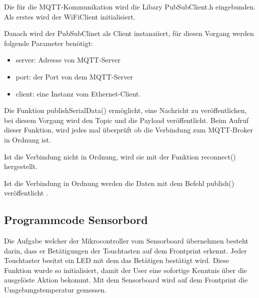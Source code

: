 Die für die MQTT-Kommunikation wird die Libary PubSubClient.h eingebunden. Als erstes wird der WiFiClient initialisiert. 

Danach wird der PubSubClinet als Client instanziiert, für diesen Vorgang werden folgende Parameter benötigt:\\
\begin{itemize}
\item 	server: Adresse von MQTT-Server\\
\item 	port: der Port von dem MQTT-Server\\
\item 	client: eine Instanz vom Ethernet-Client.\\
\end{itemize}
Die Funktion publishSerialData() ermöglicht, eine Nachricht zu veröffentlichen, bei diesem Vorgang wird den Topic und die Payload veröffentlicht. Beim Aufruf dieser Funktion, wird jedes mal überprüft ob die Verbindung zum MQTT-Broker in Ordnung ist. 

Ist die Verbindung nicht in Ordnung, wird sie mit der Funktion reconnect() hergestellt.

Ist die Verbindung in Ordnung werden die Daten mit dem Befehl publish() veröffentlicht \cite{noauthor_arduino_nodate-1}.

\subsection{Programmcode Sensorbord}
Die Aufgabe welcher der Mikrocontroller vom Sensorboard  übernehmen besteht darin, dass er Betätigungen der Touchtasten auf dem Frontprint erkennt. Jeder Touchtaster besitzt ein LED mit dem das Betätigen bestätigt wird. Diese Funktion wurde so initialisiert, damit der User eine sofortige Kenntnis über die ausgelöste Aktion bekommt. Mit dem Sensorboard wird auf dem Frontprint die Umgebungstemperatur gemessen.



